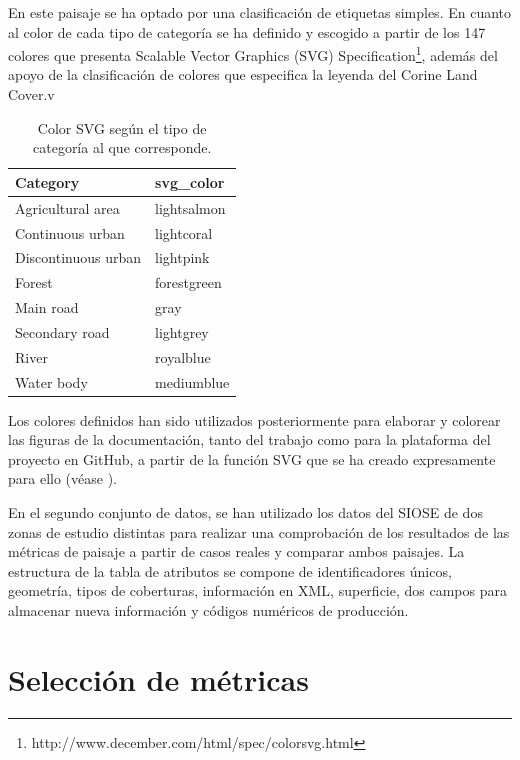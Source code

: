 En este paisaje se ha optado por una clasificación de etiquetas simples. En cuanto al color de cada tipo de categoría se ha definido y escogido a partir de los 147 colores que presenta Scalable Vector Graphics (SVG) Specification\footnote{http://www.december.com/html/spec/colorsvg.html}, además del apoyo de la clasificación de colores que especifica la leyenda del Corine Land Cover.v

\begin{table}[]
\centering
\caption{Color SVG según el tipo de categoría al que corresponde.}
\label{my-label}
\begin{tabular}{ll}
\hline
\textbf{Category}   & \textbf{svg\_color} \\ \hline
Agricultural area   & lightsalmon         \\
Continuous urban    & lightcoral          \\
Discontinuous urban & lightpink           \\
Forest              & forestgreen         \\
Main road           & gray                \\
Secondary road      & lightgrey           \\
River               & royalblue           \\
Water body          & mediumblue          \\ \hline
\end{tabular}
\end{table}

Los colores definidos han sido utilizados posteriormente para elaborar y colorear las figuras de la documentación, tanto del trabajo como para la plataforma del proyecto en GitHub, a partir de la función SVG que se ha creado expresamente para ello (véase \label{sec:Documentación de la extensión}).

En el segundo conjunto de datos, se han utilizado los datos del SIOSE de dos zonas de estudio distintas para realizar una comprobación de los resultados de las métricas de paisaje a partir de casos reales y comparar ambos paisajes. La estructura de la tabla de atributos se compone de identificadores únicos, geometría, tipos de coberturas, información en XML, superficie, dos campos para almacenar nueva información y códigos numéricos de producción.





\section{Selección de métricas}

